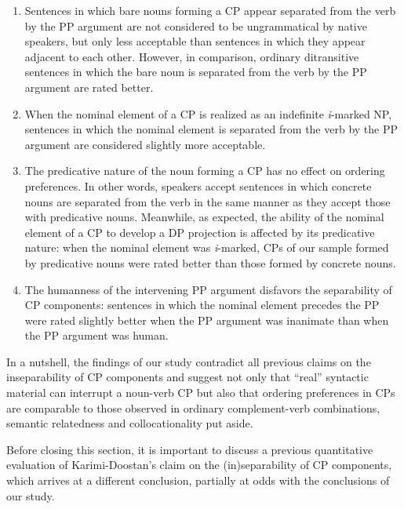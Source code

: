 \documentclass[output=paper]{langsci/langscibook}
\begin{document}
\begin{enumerate}
	\item Sentences in which bare nouns forming a CP appear separated from the verb by the PP argument are not considered to be ungrammatical by native speakers, but only less acceptable than sentences in which they appear adjacent to each other. 
	However, in comparison, ordinary ditransitive sentences in which the bare noun is separated from the verb by the PP argument are rated better.
	
	\item When the nominal element of a CP is realized as an indefinite \textit{i}-marked NP, sentences in which the nominal element is separated from the verb by the PP argument are considered slightly more acceptable.
	
	\item The predicative nature of the noun forming a CP has no effect on ordering preferences. In other words, speakers accept sentences in which concrete nouns are separated from the verb in the same manner as they accept those with predicative nouns. 
	Meanwhile, as expected, the ability of the nominal element of a CP to develop a DP projection is affected by its predicative nature: when the nominal element was \textit{i}-marked, CPs of our sample formed by predicative nouns were rated better than those formed by concrete nouns.
	
	\item The humanness of the intervening PP argument disfavors the separability of CP components: sentences in which the nominal element precedes the PP were rated slightly better when the PP argument was inanimate than when the PP argument was human.
\end{enumerate}

In a nutshell, the findings of our study contradict all previous claims on the inseparability of CP components \citep[e.g.][]{Goldberg1996,Karimi-Doostan1997,Karimi-Doostan:2011} and suggest not only that ``real'' syntactic material can interrupt a noun-verb CP but also that ordering preferences in CPs are comparable to those observed in ordinary complement-verb combinations, semantic relatedness and collocationality put aside. 

Before closing this section, it is important to discuss a previous quantitative evaluation of Karimi-Doostan's claim on the (in)separability of CP components, which arrives at a different conclusion, partially at odds with the conclusions of our study.
\end{document}
